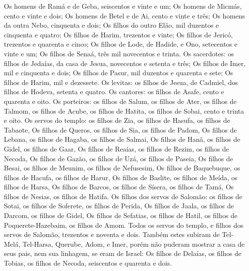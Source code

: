 {  Os homens de Ramá e de Geba, seiscentos e vinte e um;
  Os homens de Micmás, cento e vinte e dois;
  Os homens de Betel e de Ai, cento e vinte e três;
  Os homens da outra Nebo, cinquenta e dois;
  Os filhos do outro Elão, mil duzentos e cinquenta e quatro;
  Os filhos de Harim, trezentos e vinte;
  Os filhos de Jericó, trezentos e quarenta e cinco;
  Os filhos de Lode, de Hadide, e Ono, setecentos e vinte e um; %
  Os filhos de Senaá, três mil novecentos e trinta.
  Os sacerdotes: os filhos de Jedaías, da casa de Jesua, novecentos e setenta e três;
  Os filhos de Imer, mil e cinquenta e dois;
  Os filhos de Pasur, mil duzentos e quarenta e sete; %
  Os filhos de Harim, mil e dezessete. %
  Os levitas: os filhos de Jesua, de Cadmiel, dos filhos de Hodeva, setenta e quatro.
  Os cantores: os filhos de Asafe, cento e quarenta e oito.
  Os porteiros: os filhos de Salum, os filhos de Ater, os filhos de Talmom, os filhos de Acube, os filhos de Hatita, os filhos de Sobai, cento e trinta e oito.
  Os servos do templo: os filhos de Zia, os filhos de Hasufa, os filhos de Tabaote,
  Os filhos de Queros, os filhos de Sia, os filhos de Padom,
  Os filhos de Lebana, os filhos de Hagaba, os filhos de Salmai,
  Os filhos de Hanã, os filhos de Gidel, os filhos de Gaar,
  Os filhos de Reaías, os filhos de Rezim, os filhos de Necoda,
  Os filhos de Gazão, os filhos de Uzá, os filhos de Paseia,
  Os filhos de Besai, os filhos de Meunim, os filhos de Nefusesim,
  Os filhos de Baquebuque, os filhos de Hacufa, os filhos de Harur,
  Os filhos de Baslite, os filhos de Meída, os filhos de Harsa,
  Os filhos de Barcos, os filhos de Sísera, os filhos de Tamá,
  Os filhos de Nesias, os filhos de Hatifa.
  Os filhos dos servos de Salomão: os filhos de Sotai, os filhos de Soferete, os filhos de Perida,
  Os filhos de Jaala, os filhos de Darcom, os filhos de Gidel,
  Os filhos de Sefatias, os filhos de Hatil, os filhos de Poquerete-Hazebaim, os filhos de Amom.
  Todos os servos do templo, e filhos dos servos de Salomão, trezentos e noventa e dois.
  Também estes subiram de Tel-Melá, Tel-Harsa, Querube, Adom, e Imer, porém não puderam mostrar a casa de seus pais, nem sua linhagem, se eram de Israel:
  Os filhos de Delaías, os filhos de Tobias, os filhos de Necoda, seiscentos e quarenta e dois.
}
